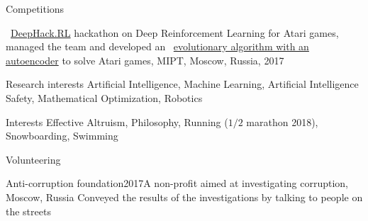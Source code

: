 \documentclass{resume} %
\begin{document}

\begin{rSection}{Competitions}
\vspace{-1em}
\item \faExternalLink~\href{http://web.archive.org/web/20170224094223/http://rl.deephack.me/}{DeepHack.RL} hackathon on Deep Reinforcement Learning for Atari games, managed the team and developed an \faExternalLink~\href{https://github.com/sergeivolodin/deephack.rl}{evolutionary algorithm with an autoencoder} to solve Atari games, MIPT, Moscow, Russia, 2017
\end{rSection}

\begin{rSection}{Research interests}
	Artificial Intelligence, Machine Learning, Artificial Intelligence Safety, Mathematical Optimization, Robotics
\end{rSection}

\begin{rSection}{Interests}
	Effective Altruism, Philosophy, Running ($1/2$ marathon 2018), Snowboarding, Swimming
\end{rSection}

\begin{rSection}{Volunteering}
	\begin{rSubsection}{Anti-corruption foundation}{2017}{A non-profit aimed at investigating corruption, Moscow, Russia}{}
		 Conveyed the results of the investigations by talking to people on the streets
	\end{rSubsection}
\end{rSection}

\end{document}
